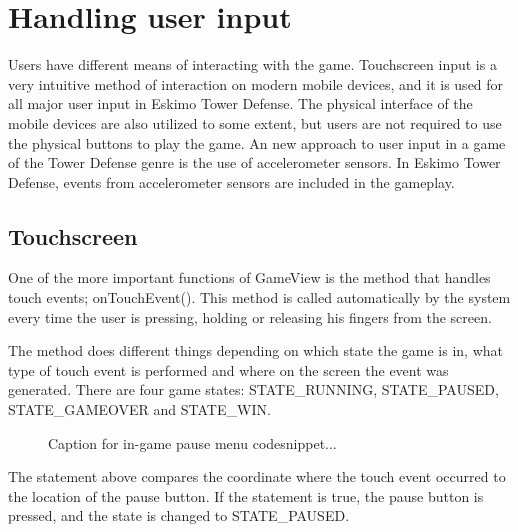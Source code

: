 \section{Handling user input}

Users have different means of interacting with the game. Touchscreen input is a very intuitive method of interaction on modern mobile devices, and it is used for all major user input in Eskimo Tower Defense. The physical interface of the mobile devices are also utilized to some extent, but users are not required to use the physical buttons to play the game. An new approach to user input in a game of the Tower Defense genre is the use of accelerometer sensors. In Eskimo Tower Defense, events from accelerometer sensors are included in the gameplay.

\subsection{Touchscreen}

One of the more important functions of GameView is the method that handles touch events; onTouchEvent(). This method is called automatically by the system every time the user is pressing, holding or releasing his fingers from the screen. 

The method does different things depending on which state the game is in, what type of touch event is performed and where on the screen the event was generated. There are four game states: STATE\_RUNNING, STATE\_PAUSED, STATE\_GAMEOVER and STATE\_WIN.


\begin{figure}[htb]

\begin{small}

\end{small}

\caption{Caption for in-game pause menu codesnippet...}
\label{fig:codeExIn-GamePauseMenu}

\end{figure}


The statement above compares the coordinate where the touch event occurred to the location of the pause button. If the statement is true, the pause button is pressed, and the state is changed to STATE\_PAUSED.

